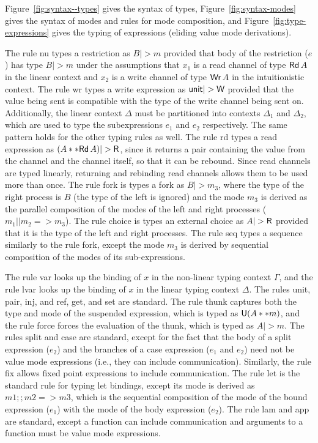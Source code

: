 \noindent Figure~\ref{fig:syntax--types} gives the syntax of types,
Figure~\ref{fig:syntax-modes} gives the syntax of modes and rules for mode
composition, and Figure~\ref{fig:type-expressions} gives the typing of
expressions (eliding value mode derivations).

 The rule nu types a restriction as
$B |> m$ provided that body of the restriction ($e$) has type $B |> m$ under the
assumptions that $x_1$ is a read channel of type $\textsf{Rd}\,A$ in the linear
context and $x_2$ is a write channel of type $\textsf{Wr}\,A$ in the intuitionistic
context. The rule wr types a write expression as $\tyUnit |> \Wm$ provided that
the value being sent is compatible with the type of the write channel being sent
on. Additionally, the linear context $\Delta$ must be partitioned into contexts $\Delta_1$
and $\Delta_2$, which are used to type the subexpressions $e_1$ and $e_2$
respectively. The same pattern holds for the other typing rules as well. The rule rd types a read expression as $(A ** \tyRd{A}) |> \Rm$, since it
returns a pair containing the value from the channel and the channel itself, so
that it can be rebound. Since read channels are typed linearly, returning and
rebinding read channels allows them to be used more than once. The rule fork is
types a fork as $B |> m_3$, where the type of the right process is $B$ (the type
of the left is ignored) and the mode $m_3$ is derived as the parallel
composition of the modes of the left and right processes ($m_1 || m_2 =>
m_3$). The rule choice is types an external choice as $A |> \Rm$ provided that
it is the type of the left and right processes. The rule seq types a sequence
similarly to the rule fork, except the mode $m_3$ is derived by sequential
composition of the modes of its sub-expressions.

The rule var looks up the binding of $x$ in the non-linear typing context $\Gamma$,
and the rule lvar looks up the binding of $x$ in the linear typing context
$\Delta$. The rules unit, pair, inj, and ref, get, and set are standard. The rule
thunk captures both the type and mode of the suspended expression, which is
typed as $\textsf{U}(A ** m)$, and the rule force forces the evaluation of the thunk,
which is typed as $A |> m$. The rules split and case are standard, except for
the fact that the body of a \textsf{split} expression ($e_2$) and the branches
of a \textsf{case} expression ($e_1$ and $e_2$) need not be value mode
expressions (i.e., they can include communication). Similarly, the rule fix
allows fixed point expressions to include communication. The rule let is the
standard rule for typing let bindings, except its mode is derived as $m1 ;; m2
=> m3$, which is the sequential composition of the mode of the bound expression
($e_1$) with the mode of the body expression ($e_2$). The rule lam and app are
standard, except a function can include communication and arguments to a
function must be value mode expressions.

